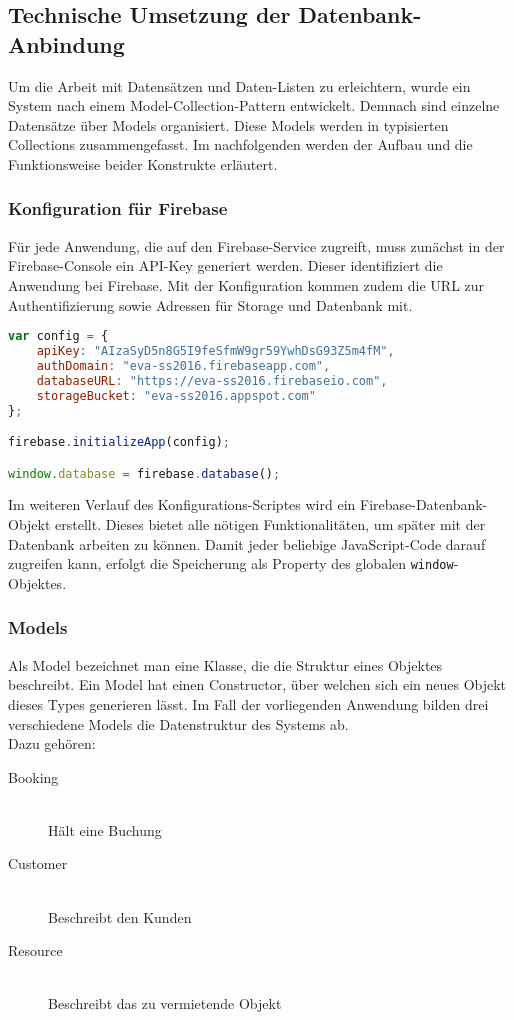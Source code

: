 \subsection{Technische Umsetzung der Datenbank-Anbindung}
Um die Arbeit mit Datensätzen und Daten-Listen zu erleichtern, wurde ein System nach einem Model-Collection-Pattern entwickelt.
Demnach sind einzelne Datensätze über Models organisiert. Diese Models werden in typisierten Collections zusammengefasst.
Im nachfolgenden werden der Aufbau und die Funktionsweise beider Konstrukte erläutert.

\subsubsection{Konfiguration für Firebase}

Für jede Anwendung, die auf den Firebase-Service zugreift, muss zunächst in der Firebase-Console ein API-Key generiert werden. Dieser identifiziert die Anwendung bei Firebase.
Mit der Konfiguration kommen zudem die URL zur Authentifizierung sowie Adressen für Storage und Datenbank mit.

\begin{lstlisting}[language=Javascript, label=code_APIConfig, caption=Konfiguration des Frontends]
var config = {
    apiKey: "AIzaSyD5n8G5I9feSfmW9gr59YwhDsG93Z5m4fM",
    authDomain: "eva-ss2016.firebaseapp.com",
    databaseURL: "https://eva-ss2016.firebaseio.com",
    storageBucket: "eva-ss2016.appspot.com"
};

firebase.initializeApp(config);

window.database = firebase.database();
\end{lstlisting}

Im weiteren Verlauf des Konfigurations-Scriptes wird ein Firebase-Datenbank-Objekt erstellt. Dieses bietet alle nötigen Funktionalitäten, um später mit der Datenbank arbeiten zu können.
Damit jeder beliebige JavaScript-Code darauf zugreifen kann, erfolgt die Speicherung als Property des globalen \texttt{window}-Objektes.

\subsubsection{Models}

Als Model bezeichnet man eine Klasse, die die Struktur eines Objektes beschreibt. Ein Model hat einen Constructor, über welchen sich ein neues Objekt dieses Types generieren lässt.
Im Fall der vorliegenden Anwendung bilden drei verschiedene Models die Datenstruktur des Systems ab.\\
Dazu gehören:
\begin{description}
\item[Booking]\hfill \\
Hält eine Buchung
\item[Customer]\hfill \\
Beschreibt den Kunden
\item[Resource]\hfill \\
Beschreibt das zu vermietende Objekt
\end{description}

